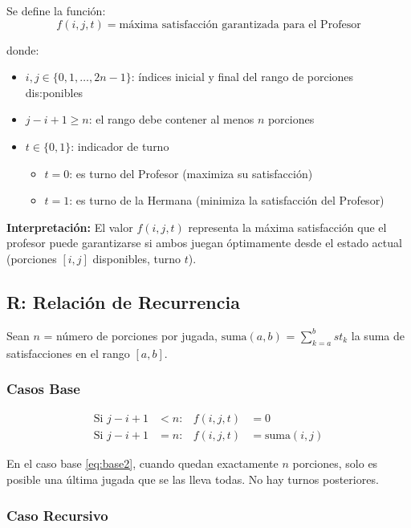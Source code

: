 \documentclass[12pt,letterpaper]{article}
\begin{document}
Se define la función:
\[
f(i, j, t) = \text{máxima satisfacción garantizada para el Profesor}
\]

donde:
\begin{itemize}
    \item $i, j \in \{0, 1, \ldots, 2n-1\}$: índices inicial y final del rango de porciones dis:ponibles
    \item $j - i + 1 \geq n$: el rango debe contener al menos $n$ porciones
    \item $t \in \{0, 1\}$: indicador de turno
    \begin{itemize}
        \item $t = 0$: es turno del Profesor (maximiza su satisfacción)
        \item $t = 1$: es turno de la Hermana (minimiza la satisfacción del Profesor)
    \end{itemize}
\end{itemize}

\textbf{Interpretación:} El valor $f(i, j, t)$ representa la máxima satisfacción que el profesor puede garantizarse si ambos juegan óptimamente desde el estado actual (porciones $[i, j]$ disponibles, turno $t$).

\subsection{R: Relación de Recurrencia}

Sean $n$ = número de porciones por jugada, $\text{suma}(a, b)$ = $\sum_{k=a}^{b} st_k$ la suma de satisfacciones en el rango $[a, b]$.

\subsubsection{Casos Base}

\begin{align}
\text{Si } j - i + 1 &< n: &f(i, j, t) &= 0 \label{eq:base1}\\
\text{Si } j - i + 1 &= n: &f(i, j, t) &= \text{suma}(i, j) \label{eq:base2}
\end{align}

En el caso base \eqref{eq:base2}, cuando quedan exactamente $n$ porciones, solo es posible una última jugada que se las lleva todas. No hay turnos posteriores.

\subsubsection{Caso Recursivo}
\end{document}
